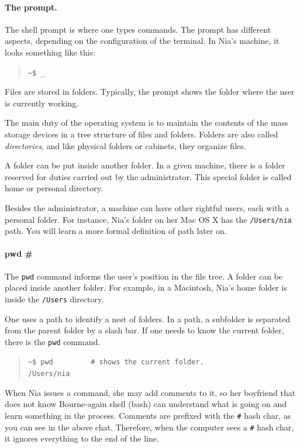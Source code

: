 \documentclass[a4paper,12pt]{book}
\begin{document}
\paragraph{The prompt.} 
The shell prompt
is where one types commands. The prompt
has different aspects, depending on the
configuration of the terminal.
In Nia's machine, it looks something like this:
\begin{quote}
\verb|~$ _|
\end{quote}
Files are stored in folders. Typically, the
prompt shows the folder where the user is
currently working.

The main duty of the
operating system is to maintain the contents of
the mass storage devices in a tree structure
of files and folders.
Folders are also called {\em directories},
and like physical folders or cabinets,
they organize files.

A folder can be put inside another folder.
In a given machine, there is a folder 
reserved for duties carried out by the
administrator.
This special folder is called home
or personal directory.

Besides the administrator, a machine can
have other rightful users, each with
a personal folder. For instance, Nia's folder
on her Mac OS X has the \verb|/Users/nia|
path. You will learn a more formal
definition of path later on.


\paragraph{pwd \#} 
The \verb|pwd| command informs
the user's position in the file tree.
A folder can be placed
inside another folder.
For example, in a Macintosh, Nia's home
folder is inside the \verb|/Users| directory.

One uses a path to identify
a nest of folders. In a path, a subfolder
is separated from the parent folder
by a slash bar. If one needs to know
the current folder, there is the \verb|pwd|
command. 
\begin{quote}
\verb|~$ pwd         # shows the current folder. |\\
\verb|/Users/nia|\\
\end{quote}
When Nia issues a command, she may
add comments to it, so her boyfriend that
does not know Bourne-again shell (bash)
can understand what
is going on and learn something in
the process. Comments are prefixed
with the \verb|#| hash char, as you
can see in the above chat. Therefore,
when the computer sees a \verb|#|
hash char, it ignores everything to
the end of the line.
\end{document}
